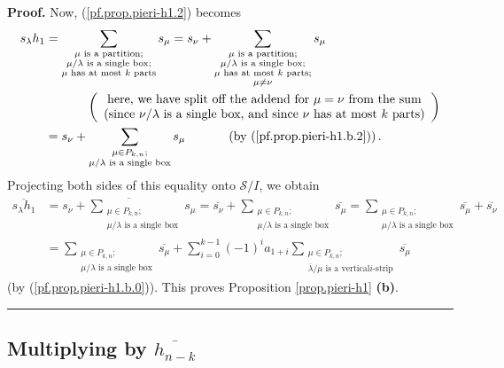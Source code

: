 \documentclass[numbers=enddot,12pt,final,onecolumn,notitlepage]{scrartcl}%
\theoremstyle{definition}
\newenvironment{proof}[1][Proof]{\noindent\textbf{#1.} }{\ \rule{0.5em}{0.5em}}
\let\sumnonlimits\sum
\renewcommand{\sum}{\sumnonlimits\limits}
\begin{document}
\begin{proof}
Now, (\ref{pf.prop.pieri-h1.2}) becomes%
\begin{align*}
s_{\lambda}h_{1}  &  =\sum_{\substack{\mu\text{ is a partition;}\\\mu
/\lambda\text{ is a single box;}\\\mu\text{ has at most }k\text{ parts}%
}}s_{\mu}=s_{\nu}+\sum_{\substack{\mu\text{ is a partition;}\\\mu
/\lambda\text{ is a single box;}\\\mu\text{ has at most }k\text{ parts;}%
\\\mu\neq\nu}}s_{\mu}\\
&  \ \ \ \ \ \ \ \ \ \ \left(
\begin{array}
[c]{c}%
\text{here, we have split off the addend for }\mu=\nu\text{ from the sum}\\
\text{(since }\nu/\lambda\text{ is a single box, and since }\nu\text{ has at
most }k\text{ parts)}%
\end{array}
\right) \\
&  =s_{\nu}+\sum_{\substack{\mu\in P_{k,n};\\\mu/\lambda\text{ is a single
box}}}s_{\mu}\ \ \ \ \ \ \ \ \ \ \left(  \text{by (\ref{pf.prop.pieri-h1.b.2}%
)}\right)  .
\end{align*}
Projecting both sides of this equality onto $\mathcal{S}/I$, we obtain%
\begin{align*}
\overline{s_{\lambda}h_{1}}  &  =\overline{s_{\nu}+\sum_{\substack{\mu\in
P_{k,n};\\\mu/\lambda\text{ is a single box}}}s_{\mu}}=\overline{s_{\nu}}%
+\sum_{\substack{\mu\in P_{k,n};\\\mu/\lambda\text{ is a single box}%
}}\overline{s_{\mu}}=\sum_{\substack{\mu\in P_{k,n};\\\mu/\lambda\text{ is a
single box}}}\overline{s_{\mu}}+\overline{s_{\nu}}\\
&  =\sum_{\substack{\mu\in P_{k,n};\\\mu/\lambda\text{ is a single box}%
}}\overline{s_{\mu}}+\sum_{i=0}^{k-1}\left(  -1\right)  ^{i}a_{1+i}%
\sum_{\substack{\mu\in P_{k,n};\\\overline{\lambda}/\mu\text{ is a vertical
}i\text{-strip}}}\overline{s_{\mu}}%
\end{align*}
(by (\ref{pf.prop.pieri-h1.b.0})). This proves Proposition \ref{prop.pieri-h1}
\textbf{(b)}.
\end{proof}

\subsection{Multiplying by $\overline{h_{n-k}}$}
\end{document}
